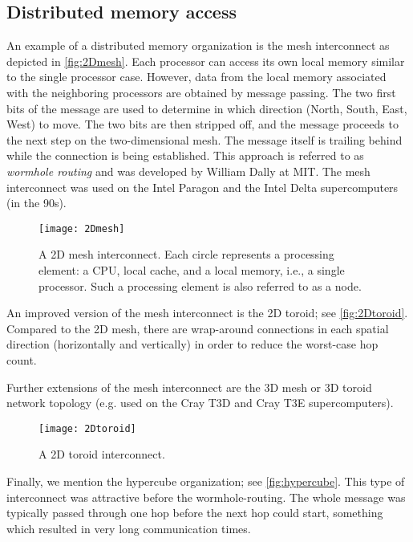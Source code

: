 \subsection{Distributed memory access}

An example of a distributed memory organization is the mesh interconnect as
depicted in \autoref{fig:2Dmesh}. Each processor can access its own local memory
similar to the single processor case. However, data from the local memory
associated with the neighboring processors are obtained by message passing. The
two first bits of the message are used to determine in which direction (North,
South, East, West) to move. The two bits are then stripped off, and the message
proceeds to the next step on the two-dimensional mesh. The message itself is
trailing behind while the connection is being established. This approach is
referred to as \emph{wormhole routing} and was developed by William Dally at
MIT. The mesh interconnect was used on the Intel Paragon and the Intel Delta
supercomputers (in the 90s).

\begin{figure}[htbp]
  \begin{center}
    \texttt{[image: 2Dmesh]}
  \end{center}
  \caption{
    A 2D mesh interconnect. Each circle represents a processing element: a CPU,
    local cache, and a local memory, i.e., a single processor. Such a processing
    element is also referred to as a node.
  }
  \label{fig:2Dmesh}
\end{figure}

An improved version of the mesh interconnect is the 2D toroid; see
\autoref{fig:2Dtoroid}. Compared to the 2D mesh, there are wrap-around
connections in each spatial direction (horizontally and vertically) in order to
reduce the worst-case hop count.

Further extensions of the mesh interconnect are the 3D mesh or 3D toroid network
topology (e.g. used on the Cray T3D and Cray T3E supercomputers).

\begin{figure}[htbp]
  \begin{center}
    \texttt{[image: 2Dtoroid]}
  \end{center}
  \caption{A 2D toroid interconnect.}
  \label{fig:2Dtoroid}
\end{figure}

Finally, we mention the hypercube organization; see \autoref{fig:hypercube}.
This type of interconnect was attractive before the wormhole-routing. The whole
message was typically passed through one hop before the next hop could start,
something which resulted in very long communication times.

